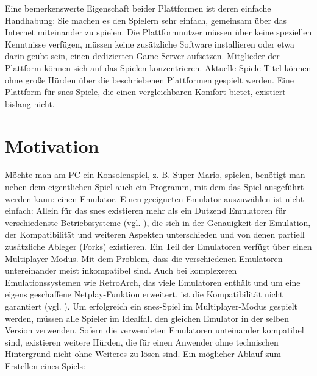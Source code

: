 Eine bemerkenswerte Eigenschaft beider Plattformen ist deren einfache
Handhabung: Sie machen es den Spielern sehr einfach, gemeinsam über das
Internet miteinander zu spielen. Die Plattformnutzer müssen über keine
speziellen Kenntnisse verfügen, müssen keine zusätzliche Software
installieren oder etwa darin geübt sein, einen dedizierten Game-Server
aufsetzen. Mitglieder der Plattform können sich auf das Spielen
konzentrieren. Aktuelle Spiele-Titel können ohne große Hürden über die
beschriebenen Plattformen gespielt werden. Eine Plattform für
\gls{snes}-Spiele, die einen vergleichbaren Komfort bietet, existiert
bislang nicht.

\section{Motivation}\label{motivation}

Möchte man am PC ein Konsolenspiel, z. B. Super Mario, spielen, benötigt
man neben dem eigentlichen Spiel auch ein Programm, mit dem das Spiel
ausgeführt werden kann: einen Emulator. Einen geeigneten Emulator
auszuwählen ist nicht einfach: Allein für das \gls{snes} existieren mehr
als ein Dutzend Emulatoren für verschiedenste Betriebssysteme (vgl.
\cite{snes-emulator-list}), die sich in der Genauigkeit der Emulation,
der Kompatibilität und weiteren Aspekten unterschieden und von denen
partiell zusätzliche Ableger (Forks) existieren\todo{}. Ein Teil der
Emulatoren verfügt über einen Multiplayer-Modus. Mit dem Problem, dass
die verschiedenen Emulatoren untereinander meist inkompatibel
sind\todo{}. Auch bei komplexeren Emulationssystemen wie RetroArch, das
viele Emulatoren enthält und um eine eigens geschaffene Netplay-Funktion
erweitert, ist die Kompatibilität nicht garantiert (vgl.
\cite{retroarch-netplay-comp}). Um erfolgreich ein \gls{snes}-Spiel im
Multiplayer-Modus gespielt werden, müssen alle Spieler im Idealfall den
gleichen Emulator in der selben Version verwenden. Sofern die
verwendeten Emulatoren unteinander kompatibel sind, existieren weitere
Hürden, die für einen Anwender ohne technischen Hintergrund nicht ohne
Weiteres zu lösen sind. Ein möglicher Ablauf zum Erstellen eines Spiels:

